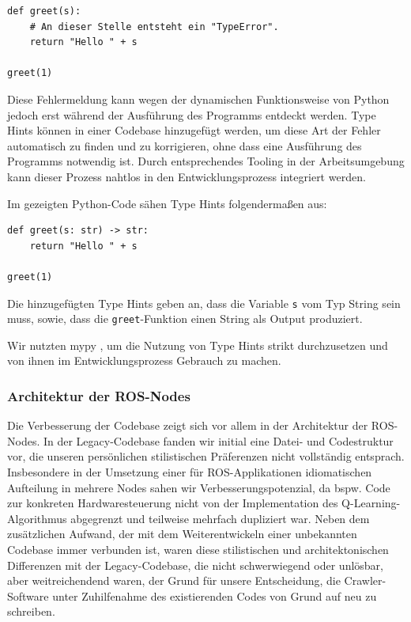 \begin{verbatim}
def greet(s):
	# An dieser Stelle entsteht ein "TypeError".
	return "Hello " + s

greet(1)
\end{verbatim}

Diese Fehlermeldung kann wegen der dynamischen Funktionsweise von Python jedoch erst während der Ausführung des Programms entdeckt werden. Type Hints können in einer Codebase hinzugefügt werden, um diese Art der Fehler automatisch zu finden und zu korrigieren, ohne dass eine Ausführung des Programms notwendig ist. Durch entsprechendes Tooling in der Arbeitsumgebung kann dieser Prozess nahtlos in den Entwicklungsprozess integriert werden.

Im gezeigten Python-Code sähen Type Hints folgendermaßen aus:

\begin{verbatim}
def greet(s: str) -> str:
	return "Hello " + s

greet(1)
\end{verbatim}

Die hinzugefügten Type Hints geben an, dass die Variable \texttt{s} vom Typ String sein muss, sowie, dass die \texttt{greet}-Funktion einen String als Output produziert.

Wir nutzten mypy \cite{mypy}, um die Nutzung von Type Hints strikt durchzusetzen und von ihnen im Entwicklungsprozess Gebrauch zu machen.

\subsubsection{Architektur der ROS-Nodes}


Die Verbesserung der Codebase zeigt sich vor allem in der Architektur der ROS-Nodes. In der Legacy-Codebase fanden wir initial eine Datei- und Codestruktur vor, die unseren persönlichen stilistischen Präferenzen nicht vollständig entsprach. Insbesondere in der Umsetzung einer für ROS-Applikationen idiomatischen Aufteilung in mehrere Nodes sahen wir Verbesserungspotenzial, da bspw. Code zur konkreten Hardwaresteuerung nicht von der Implementation des Q-Learning-Algorithmus abgegrenzt und teilweise mehrfach dupliziert war. Neben dem zusätzlichen Aufwand, der mit dem Weiterentwickeln einer unbekannten Codebase immer verbunden ist, waren diese stilistischen und architektonischen Differenzen mit der Legacy-Codebase, die nicht schwerwiegend oder unlösbar, aber weitreichendend waren, der Grund für unsere Entscheidung, die Crawler-Software unter Zuhilfenahme des existierenden Codes von Grund auf neu zu schreiben. 


